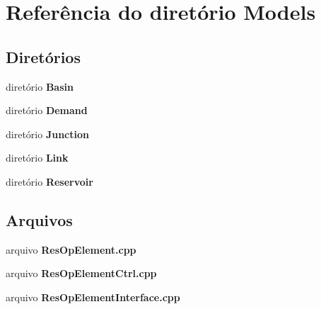 \section{Referência do diretório Models}
\label{dir_d3ca042293c375054fd8772ea6fdc15a}
\subsection*{Diretórios}
\begin{DoxyCompactItemize}
\item 
diretório {\bf Basin}
\item 
diretório {\bf Demand}
\item 
diretório {\bf Junction}
\item 
diretório {\bf Link}
\item 
diretório {\bf Reservoir}
\end{DoxyCompactItemize}
\subsection*{Arquivos}
\begin{DoxyCompactItemize}
\item 
arquivo {\bf Res\+Op\+Element.\+cpp}
\item 
arquivo {\bf Res\+Op\+Element\+Ctrl.\+cpp}
\item 
arquivo {\bf Res\+Op\+Element\+Interface.\+cpp}
\end{DoxyCompactItemize}
